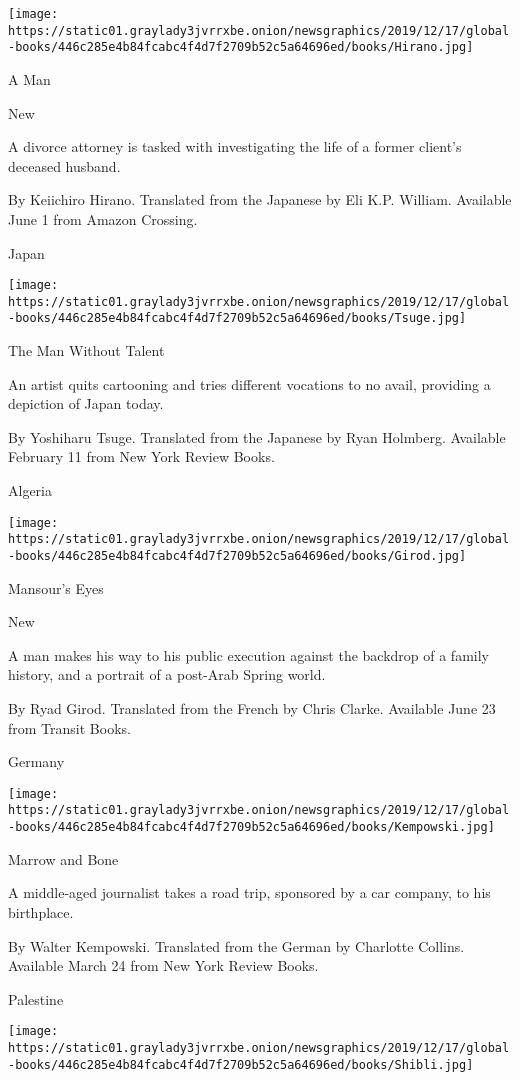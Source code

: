 \texttt{[image: https://static01.graylady3jvrrxbe.onion/newsgraphics/2019/12/17/global-books/446c285e4b84fcabc4f4d7f2709b52c5a64696ed/books/Hirano.jpg]}

A Man

New

A divorce attorney is tasked with investigating the life of a former
client's deceased husband.

 By Keiichiro Hirano. Translated from the Japanese by Eli K.P. William.
Available June 1 from Amazon Crossing.

Japan

\texttt{[image: https://static01.graylady3jvrrxbe.onion/newsgraphics/2019/12/17/global-books/446c285e4b84fcabc4f4d7f2709b52c5a64696ed/books/Tsuge.jpg]}

The Man Without Talent

An artist quits cartooning and tries different vocations to no avail,
providing a depiction of Japan today.

 By Yoshiharu Tsuge. Translated from the Japanese by Ryan Holmberg.
Available February 11 from New York Review Books.

Algeria

\texttt{[image: https://static01.graylady3jvrrxbe.onion/newsgraphics/2019/12/17/global-books/446c285e4b84fcabc4f4d7f2709b52c5a64696ed/books/Girod.jpg]}

Mansour's Eyes

New

A man makes his way to his public execution against the backdrop of a
family history, and a portrait of a post-Arab Spring world.

 By Ryad Girod. Translated from the French by Chris Clarke. Available
June 23 from Transit Books.

Germany

\texttt{[image: https://static01.graylady3jvrrxbe.onion/newsgraphics/2019/12/17/global-books/446c285e4b84fcabc4f4d7f2709b52c5a64696ed/books/Kempowski.jpg]}

Marrow and Bone

A middle-aged journalist takes a road trip, sponsored by a car company,
to his birthplace.

 By Walter Kempowski. Translated from the German by Charlotte Collins.
Available March 24 from New York Review Books.

Palestine

\texttt{[image: https://static01.graylady3jvrrxbe.onion/newsgraphics/2019/12/17/global-books/446c285e4b84fcabc4f4d7f2709b52c5a64696ed/books/Shibli.jpg]}

